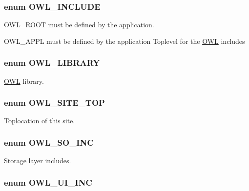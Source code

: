 \subsubsection[{OWL\_\-INCLUDE}]{\setlength{\rightskip}{0pt plus 5cm}enum {\bf OWL\_\-INCLUDE}}\label{OWLloader_8php_a4d33a8f2fcc9c83cbeea921c4cb23a7f}


OWL\_\-ROOT must be defined by the application. 

OWL\_\-APPL must be defined by the application Toplevel for the \hyperlink{classOWL}{OWL} includes 
\subsubsection[{OWL\_\-LIBRARY}]{\setlength{\rightskip}{0pt plus 5cm}enum {\bf OWL\_\-LIBRARY}}\label{OWLloader_8php_a74eed08508c8b70677c4167acf49e427}


\hyperlink{classOWL}{OWL} library. 

\subsubsection[{OWL\_\-SITE\_\-TOP}]{\setlength{\rightskip}{0pt plus 5cm}enum {\bf OWL\_\-SITE\_\-TOP}}\label{OWLloader_8php_a462de9ae02e394313337afac5d1a5f95}


Toplocation of this site. 

\subsubsection[{OWL\_\-SO\_\-INC}]{\setlength{\rightskip}{0pt plus 5cm}enum {\bf OWL\_\-SO\_\-INC}}\label{OWLloader_8php_a75dffdef5ba58a0ba5f21ed40627897f}


Storage layer includes. 

\subsubsection[{OWL\_\-UI\_\-INC}]{\setlength{\rightskip}{0pt plus 5cm}enum {\bf OWL\_\-UI\_\-INC}}\label{OWLloader_8php_a2e11101c70f011a91d0d9c7f8e217738}


